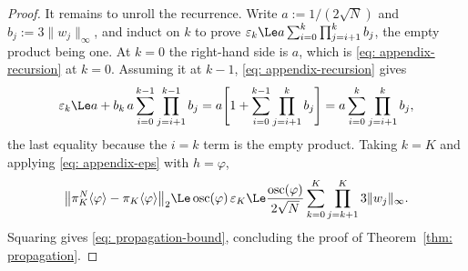 \documentclass{article}
\begin{document}
\begin{proof}
It remains to unroll the recurrence. Write $a:=1/(2\sqrt N)$ and $b_j:=3\lVert w_j\rVert_\infty$, and induct on $k$ to prove $\varepsilon_k \Le a\sum_{i=0}^{k}\prod_{j=i+1}^{k}b_j$, the empty product being one. At $k=0$ the right-hand side is $a$, which is \eqref{eq: appendix-recursion} at $k=0$. Assuming it at $k-1$, \eqref{eq: appendix-recursion} gives
\begin{equation*}
    \varepsilon_k \Le a + b_k\,a\sum_{i=0}^{k-1}\prod_{j=i+1}^{k-1}b_j
    = a\Biggl[1+\sum_{i=0}^{k-1}\prod_{j=i+1}^{k}b_j\Biggr]
    = a\sum_{i=0}^{k}\prod_{j=i+1}^{k}b_j ,
\end{equation*}
the last equality because the $i=k$ term is the empty product. Taking $k=K$ and applying \eqref{eq: appendix-eps} with $h=\varphi$,
\begin{equation*}
    \bigl\lVert\pi_K^N\langle \varphi\rangle-\pi_K\langle \varphi\rangle\bigr\rVert_2
    \Le \operatorname{osc}(\varphi)\,\varepsilon_K
    \Le \frac{\operatorname{osc}(\varphi)}{2\sqrt N}\sum_{k=0}^{K}\prod_{j=k+1}^{K}3\lVert w_j\rVert_\infty .
\end{equation*}
Squaring gives \eqref{eq: propagation-bound}, concluding the proof of Theorem~\ref{thm: propagation}.
\end{proof}
\end{document}
